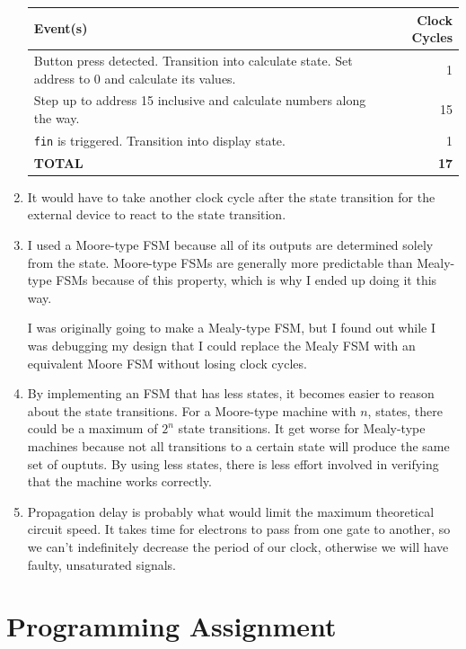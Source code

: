 \documentclass{article}
\begin{document}
\begin{enumerate}
{        \begin{tabular}{| p{8cm} | r |}
            \hline
            \textbf{Event(s)} & \textbf{Clock Cycles} \\
            \hline
            Button press detected. Transition into calculate state. Set address to 0 and calculate its values. & 1 \\
            \hline
            Step up to address 15 inclusive and calculate numbers along the way. & 15 \\ 
            \hline
            \texttt{fin} is triggered. Transition into display state. & 1 \\
            \hline
            \textbf{TOTAL} & \textbf{17} \\
            \hline
        \end{tabular}
    }
    \item It would have to take another clock cycle after the state transition for the external device to react to the state transition.
    \item {
        I used a Moore-type FSM because all of its outputs are determined solely from the state. Moore-type FSMs are generally more predictable
        than Mealy-type FSMs because of this property, which is why I ended up doing it this way. 
        
        I was originally going to make a Mealy-type FSM, but I found out
        while I was debugging my design that I could replace the Mealy FSM with an equivalent Moore FSM without losing clock cycles.
    }
    \item {
        By implementing an FSM that has less states, it becomes easier to reason about the state transitions. For a Moore-type machine with $n$,
        states, there could be a maximum of $2^n$ state transitions. It get worse for Mealy-type machines because not all transitions to a certain
        state will produce the same set of ouptuts. By using less states, there is less effort involved in verifying that the machine works correctly.
    }
    \item {
        Propagation delay is probably what would limit the maximum theoretical circuit speed. It takes time for electrons to pass from one gate to
        another, so we can't indefinitely decrease the period of our clock, otherwise we will have faulty, unsaturated signals.
    }

\end{enumerate}

\section{Programming Assignment}
\end{document}
